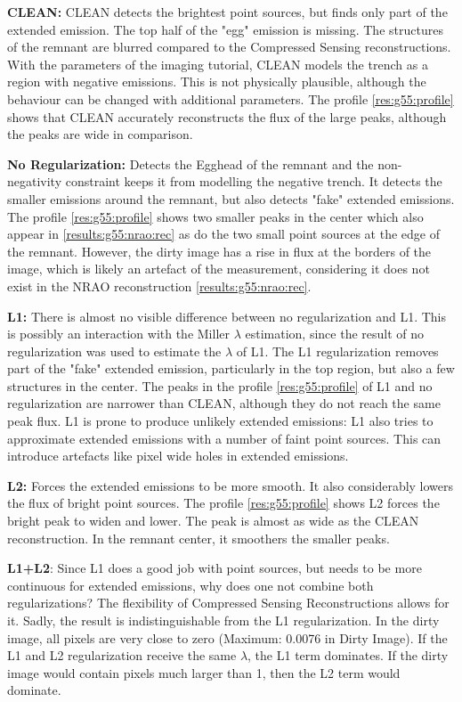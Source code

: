 \textbf{CLEAN:} CLEAN detects the brightest point sources, but finds only part of the extended emission. The top half of the "egg" emission is missing. The structures of the remnant are blurred compared to the Compressed Sensing reconstructions. With the parameters of the imaging tutorial, CLEAN models the trench as a region with negative emissions. This is not physically plausible, although the behaviour can be changed with additional parameters. The profile \ref{res:g55:profile} shows that CLEAN accurately reconstructs the flux of the large peaks, although the peaks are wide in comparison.

\textbf{No Regularization:} Detects the Egghead of the remnant and the non-negativity constraint keeps it from modelling the negative trench. It detects the smaller emissions around the remnant, but also detects "fake" extended emissions. The profile \ref{res:g55:profile}  shows two smaller peaks in the center which also appear in \ref{results:g55:nrao:rec} as do the two small point sources at the edge of the remnant. However, the dirty image has a rise in flux at the borders of the image, which is likely an artefact of the measurement, considering it does not exist in the NRAO reconstruction \ref{results:g55:nrao:rec}.

\textbf{L1:} There is almost no visible difference between no regularization and L1. This is possibly an interaction with the Miller $\lambda$ estimation, since the result of no regularization was used to estimate the $\lambda$ of L1. The L1 regularization removes part of the "fake" extended emission, particularly in the top region, but also a few structures in the center. The peaks in the profile \ref{res:g55:profile} of L1 and no regularization are narrower than CLEAN, although they do not reach the same peak flux. L1 is prone to produce unlikely extended emissions: L1 also tries to approximate extended emissions with a number of faint point sources. This can introduce artefacts like pixel wide holes in extended emissions.

\textbf{L2:} Forces the extended emissions to be more smooth. It also considerably lowers the flux of bright point sources. The profile \ref{res:g55:profile} shows L2 forces the bright peak to widen and lower. The peak is almost as wide as the CLEAN reconstruction. In the remnant center, it smoothers the smaller peaks.

\textbf{L1+L2}: Since L1 does a good job with point sources, but needs to be more continuous for extended emissions, why does one not combine both regularizations? The flexibility of Compressed Sensing Reconstructions allows for it. Sadly, the result is indistinguishable from the L1 regularization. In the dirty image, all pixels are very close to zero (Maximum: 0.0076 in Dirty Image). If the L1 and L2 regularization receive the same $\lambda$, the L1 term dominates. If the dirty image would contain pixels much larger than 1, then the L2 term would dominate.

